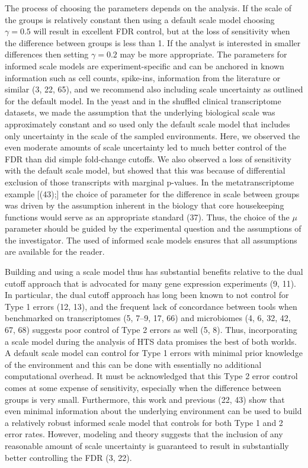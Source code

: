 \documentclass[
]{article}
\begin{document}
The process of choosing the parameters depends on the analysis. If the
scale of the groups is relatively constant then using a default scale
model choosing \(\gamma = 0.5\) will result in excellent FDR control,
but at the loss of sensitivity when the difference between groups is
less than 1. If the analyst is interested in smaller differences then
setting \(\gamma = 0.2\) may be more appropriate. The parameters for
informed scale models are experiment-specific and can be anchored in
known information such as cell counts, spike-ins, information from the
literature or similar (3, 22, 65), and we recommend also including scale
uncertainty as outlined for the default model. In the yeast and in the
shuffled clinical transcriptome datasets, we made the assumption that
the underlying biological scale was approximately constant and so used
only the default scale model that includes only uncertainty in the scale
of the sampled environments. Here, we observed the even moderate amounts
of scale uncertainty led to much better control of the FDR than did
simple fold-change cutoffs. We also observed a loss of sensitivity with
the default scale model, but showed that this was because of
differential exclusion of those transcripts with marginal p-values. In
the metatranscriptome example {[}(43);{]} the choice of parameter for
the difference in scale between groups was driven by the assumption
inherent in the biology that core housekeeping functions would serve as
an appropriate standard (37). Thus, the choice of the \(\mu\) parameter
should be guided by the experimental question and the assumptions of the
investigator. The used of informed scale models ensures that all
assumptions are available for the reader.

Building and using a scale model thus has substantial benefits relative
to the dual cutoff approach that is advocated for many gene expression
experiments (9, 11). In particular, the dual cutoff approach has long
been known to not control for Type 1 errors (12, 13), and the frequent
lack of concordance between tools when benchmarked on transcriptomes (5,
7--9, 17, 66) and microbiomes (4, 6, 32, 42, 67, 68) suggests poor
control of Type 2 errors as well (5, 8). Thus, incorporating a scale
model during the analysis of HTS data promises the best of both worlds.
A default scale model can control for Type 1 errors with minimal prior
knowledge of the environment and this can be done with essentially no
additional computational overhead. It must be acknowledged that this
Type 2 error control comes at some expense of sensitivity, especially
when the difference between groups is very small. Furthermore, this work
and previous (22, 43) show that even minimal information about the
underlying environment can be used to build a relatively robust informed
scale model that controls for both Type 1 and 2 error rates. However,
modeling and theory suggests that the inclusion of any reasonable amount
of scale uncertainty is guaranteed to result in substantially better
controlling the FDR (3, 22).
\end{document}
